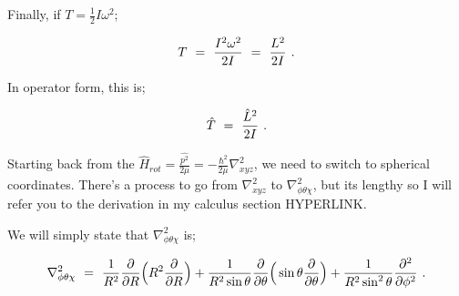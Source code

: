 \documentclass{article}
\begin{document}
Finally, if \begin{math} T = \frac{1}{2} I \omega^{2} \end{math};

\begin{equation} \label{eq:256}
T \hspace{0.125cm} = \hspace{0.125cm} \frac{I^2 \omega^{2}}{2 I} \hspace{0.125cm} = \hspace{0.125cm} \frac{L^2}{2I} \hspace{0.125cm} .
\end{equation}

In operator form, this is;

\begin{equation} \label{eq:256}
\hat{T} \hspace{0.125cm} = \hspace{0.125cm} \frac{\hat{L}^2}{2I} \hspace{0.125cm} .
\end{equation}

Starting back from the \begin{math} \hat{H}_{rot} = \frac{\hat{p^{2}}}{2 \mu} = -\frac{\hbar^{2}}{2 \mu} \nabla_{xyz}^{2} \end{math}, we need to switch to spherical coordinates. There's a process to go from \begin{math} \nabla_{xyz}^{2} \end{math} to \begin{math} \nabla_{\phi \theta \chi}^{2} \end{math}, but its lengthy so I will refer you to the derivation in my calculus section HYPERLINK. 

We will simply state that \begin{math} \nabla_{\phi \theta \chi}^{2} \end{math} is;

\begin{equation} \label{eq:256}
\nabla_{\phi \theta \chi}^{2} \hspace{0.125cm} = \hspace{0.125cm} \frac{1}{R^2}\frac{\partial}{\partial{R}}\Big( R^2 \frac{\partial}{\partial{R}}\Big) + \frac{1}{R^2 \sin{\theta}}\frac{\partial}{\partial{\theta}}\Big(\sin{\theta}\frac{\partial}{\partial{\theta}}\Big) + \frac{1}{R^2 \sin^{2}{\theta}}\frac{\partial^{2}}{\partial{\phi}^{2}} \hspace{0.125cm} .
\end{equation}
\end{document}
